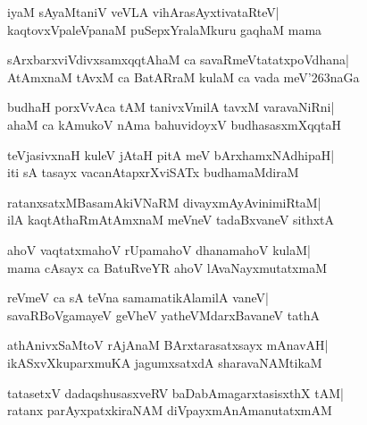 \documentclass[twoside,12pt,openright]{book}
\def\S{\char'263}
\newcounter{shloka}[chapter]
\begin{document}
\begin{shloka}%
iyaM sAyaMtaniV veVLA vihArasAyxtivataRteV|\\
kaqtovxVpaleVpanaM puSepxYralaMkuru gaqhaM mama
\end{shloka}

\begin{shloka}%
sArxbarxviVdivxsamxqqtAhaM ca savaRmeVtatatxpoVdhana|\\
AtAmxnaM tAvxM ca BatARraM kulaM ca vada meV\S naGa
\end{shloka}

\begin{shloka}%
budhaH porxVvAca tAM tanivxVmilA tavxM varavaNiRni|\\
ahaM ca kAmukoV nAma bahuvidoyxV budhasasxmXqqtaH
\end{shloka}

\begin{shloka}%
teVjasivxnaH kuleV jAtaH pitA meV bArxhamxNAdhipaH|\\
iti sA tasayx vacanAtapxrXviSATx budhamaMdiraM
\end{shloka}

\begin{shloka}%
ratanxsatxMBasamAkiVNaRM divayxmAyAvinimiRtaM|\\
ilA kaqtAthaRmAtAmxnaM meVneV tadaBxvaneV sithxtA
\end{shloka}

\begin{shloka}%
ahoV vaqtatxmahoV rUpamahoV dhanamahoV kulaM|\\
mama cAsayx ca BatuRveYR ahoV lAvaNayxmutatxmaM
\end{shloka}

\begin{shloka}%
reVmeV ca sA teVna samamatikAlamilA vaneV|\\
savaRBoVgamayeV geVheV yatheVMdarxBavaneV tathA
\end{shloka}

\begin{shloka}%
athAnivxSaMtoV rAjAnaM BArxtarasatxsayx mAnavAH|\\
ikASxvXkuparxmuKA jagumxsatxdA sharavaNAMtikaM
\end{shloka}

\begin{shloka}%
tatasetxV dadaqshusasxveRV baDabAmagarxtasisxthX tAM|\\
ratanx parAyxpatxkiraNAM diVpayxmAnAmanutatxmAM
\end{shloka}
\end{document}
